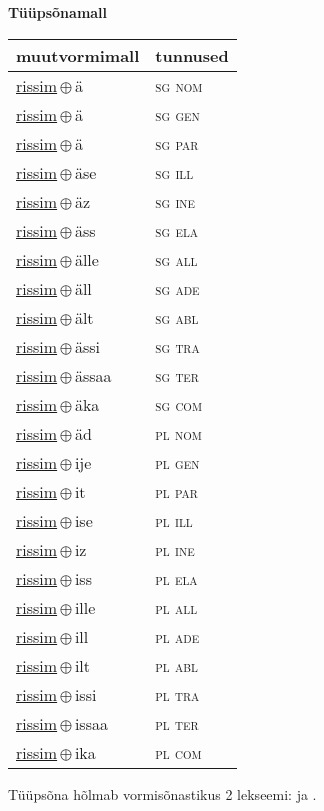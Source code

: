 

\vspace{3.5em}
\noindent \begin{minipage}{\textwidth}
\noindent \textbf{Tüüpsõnamall \,}\\

\begin{sideways}
\begin{tabular}{l l}
muutvormimall & tunnused \\
\hline
\underline{rissim}\,$\oplus$\,ä & \textsc{ sg nom } \\
\underline{rissim}\,$\oplus$\,ä & \textsc{ sg gen } \\
\underline{rissim}\,$\oplus$\,ä & \textsc{ sg par } \\
\underline{rissim}\,$\oplus$\,äse & \textsc{ sg ill } \\
\underline{rissim}\,$\oplus$\,äz & \textsc{ sg ine } \\
\underline{rissim}\,$\oplus$\,äss & \textsc{ sg ela } \\
\underline{rissim}\,$\oplus$\,älle & \textsc{ sg all } \\
\underline{rissim}\,$\oplus$\,äll & \textsc{ sg ade } \\
\underline{rissim}\,$\oplus$\,ält & \textsc{ sg abl } \\
\underline{rissim}\,$\oplus$\,ässi & \textsc{ sg tra } \\
\underline{rissim}\,$\oplus$\,ässaa & \textsc{ sg ter } \\
\underline{rissim}\,$\oplus$\,äka & \textsc{ sg com } \\
\underline{rissim}\,$\oplus$\,äd & \textsc{ pl nom } \\
\underline{rissim}\,$\oplus$\,ije & \textsc{ pl gen } \\
\underline{rissim}\,$\oplus$\,it & \textsc{ pl par } \\
\underline{rissim}\,$\oplus$\,ise & \textsc{ pl ill } \\
\underline{rissim}\,$\oplus$\,iz & \textsc{ pl ine } \\
\underline{rissim}\,$\oplus$\,iss & \textsc{ pl ela } \\
\underline{rissim}\,$\oplus$\,ille & \textsc{ pl all } \\
\underline{rissim}\,$\oplus$\,ill & \textsc{ pl ade } \\
\underline{rissim}\,$\oplus$\,ilt & \textsc{ pl abl } \\
\underline{rissim}\,$\oplus$\,issi & \textsc{ pl tra } \\
\underline{rissim}\,$\oplus$\,issaa & \textsc{ pl ter } \\
\underline{rissim}\,$\oplus$\,ika & \textsc{ pl com } \\
\end{tabular}
\end{sideways}
\label{tab:tüüpsõnamall-rissimä}

\end{minipage}

 
\vspace{1em}
\noindent Tüüpsõna hõlmab vormisõnastikus 2 lekseemi:  ja .
